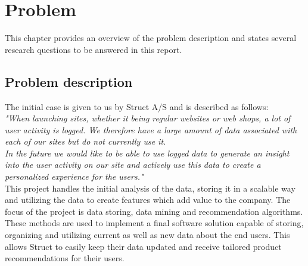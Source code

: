 
\chapter{Problem} %

\label{Chapter1} %

This chapter provides an overview of the problem description and states several research questions to be answered in this report.

\section{Problem description}

The initial case is given to us by Struct A/S and is described as follows: \\

\textit{"When launching sites, whether it being regular websites or web shops, a lot of user activity is logged. We therefore have a large amount of data associated with each of our sites but do not currently use it.} \\
\textit{In the future we would like to be able to use logged data to generate an insight into the user activity on our site and actively use this data to create a personalized experience for the users."} \\

This project handles the initial analysis of the data, storing it in a scalable way and utilizing the data to create features which add value to the company. The focus of the project is data storing, data mining and recommendation algorithms. These methods are used to implement a final software solution capable of storing, organizing and utilizing current as well as new data about the end users. This allows Struct to easily keep their data updated and receive tailored product recommendations for their users.





